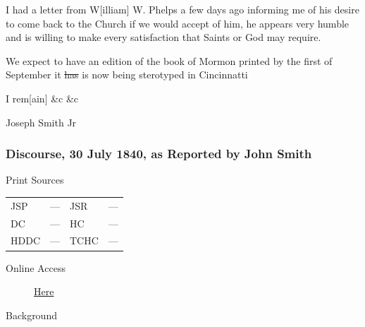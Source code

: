 				I had a letter from W[illiam] W. Phelps a few days ago informing me of his desire to come back to the Church if we would accept of him, he appears very humble and is willing to make every satisfaction that Saints or God may require.

				We expect to have an edition of the book of Mormon printed by the first of September it \sout{has} is now being sterotyped in Cincinnatti

				\begin{tightright}
					I rem[ain] \&c \&c

					Joseph Smith Jr
				\end{tightright}
				
		\subsubsection{Discourse, 30 July 1840, as Reported by John Smith}
			\label{EMS-1840-JS-30-JUL-1840}
			
			\begin{description}
				\item[Print Sources]
			\end{description}

			\begin{tabular}{p{0.5in}p{1in}p{0.5in}p{1in}}
				JSP	 	& ---		& JSR 		& --- \\
				DC	 	& ---		& HC 		& --- \\
				HDDC 	& ---		& TCHC 		& --- \\
			\end{tabular}
			
			\begin{description}
				\item[Online Access] \href{https://www.josephsmithpapers.org/paper-summary/discourse-30-july-1840-as-reported-by-john-smith/1}{Here}
			\end{description}
			
			\begin{description}
				\item[Background]
			\end{description}
			
			
